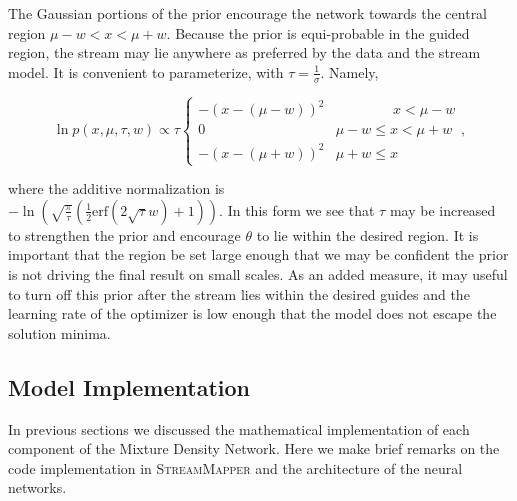 \documentclass[twocolumn]{aastex631}
\newcommand{\code}[1]{\textsc{#1}}
\newcommand{\package}[1]{\code{#1}}
\newcommand{\pdf}{p}
\begin{document}
            The Gaussian portions of the prior encourage the network towards the
            central region $\mu - w < x < \mu + w$. Because the prior is
            equi-probable in the guided region, the stream may lie anywhere as
            preferred by the data and the stream model.  It is convenient to
            parameterize, with $\tau = \frac{1}{\sigma}$. Namely,
            \begin{small}
            \begin{equation}
                \ln \pdf(x,\mu, \tau, w) \propto \tau
                \begin{cases} 
                    -\left(x-(\mu-w)\right)^2 & \phantom{\mu - w <}\ x < \mu - w \\
                    0 & \mu - w \leq x < \mu + w \\
                    -\left(x-(\mu+w)\right)^2 & \mu + w \leq x
                \end{cases},
            \end{equation}
            \end{small}
            where the additive normalization is
            \\
            $-\ln\left(\sqrt{\frac{\pi}{\tau}}
            \left(\frac{1}{2}\text{erf}\left(2 \sqrt{\tau }
            w\right)+1\right)\right)$.  In this form we see that $\tau$ may be
            increased to strengthen the prior and encourage $\theta$ to lie
            within the desired region. It is important that the region be set
            large enough that we may be confident the prior is not driving the
            final result on small scales. As an added measure, it may useful to
            turn off this prior after the stream lies within the desired guides
            and the learning rate of the optimizer is low enough that the model
            does not escape the solution minima.



    \subsection{Model Implementation} \label{sub:methods:model_implementation}

        In previous sections we discussed the mathematical implementation of
        each component of the Mixture Density Network. Here we make brief
        remarks on the code implementation in \package{StreamMapper} and the
        architecture of the neural networks.
\end{document}
